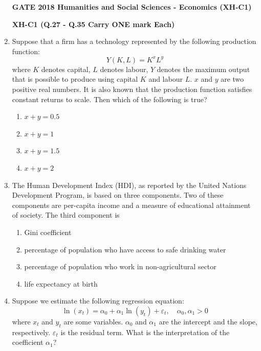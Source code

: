 \documentclass[journal,12pt,onecolumn]{exam}
\theoremstyle{remark}
\begin{document}
\begin{enumerate}
\newpage
\textbf{GATE 2018 Humanities and Social Sciences - Economics (XH-C1)}

\vspace{2em}

\textbf{XH-C1 (Q.27 - Q.35 Carry ONE mark Each)}
\item Suppose that a firm has a technology represented by the following production function:
  \[
    Y(K, L) = K^x L^y
  \]
  where $K$ denotes capital, $L$ denotes labour, $Y$ denotes the maximum output that is possible to produce using capital $K$ and labour $L$. $x$ and $y$ are two positive real numbers. It is also known that the production function satisfies constant returns to scale. Then which of the following is true?

  \begin{enumerate}
    \item $x + y = 0.5$
    \item $x + y = 1$
    \item $x + y = 1.5$
    \item $x + y = 2$
  \end{enumerate}
  
  \vspace{2em}

  \item The Human Development Index (HDI), as reported by the United Nations Development Program, is based on three components. Two of these components are per-capita income and a measure of educational attainment of society. The third component is

  \begin{enumerate}
    \item Gini coefficient
    \item percentage of population who have access to safe drinking water
    \item percentage of population who work in non-agricultural sector
    \item life expectancy at birth
  \end{enumerate}

 \item Suppose we estimate the following regression equation:
  \[
    \ln(x_t) = \alpha_0 + \alpha_1 \ln(y_t) + \varepsilon_t, \quad \alpha_0, \alpha_1 > 0
  \]
  where $x_t$ and $y_t$ are some variables. $\alpha_0$ and $\alpha_1$ are the intercept and the slope, respectively. $\varepsilon_t$ is the residual term. What is the interpretation of the coefficient $\alpha_1$?


\end{enumerate}
\end{document}
